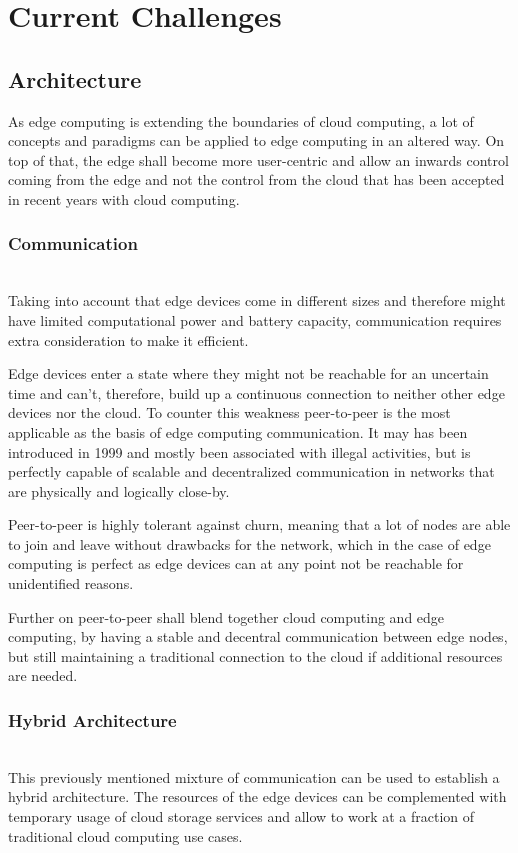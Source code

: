 \section{Current Challenges}\label{sec:main}

\subsection{Architecture}
As edge computing is extending the boundaries of cloud computing, a lot of concepts and paradigms can be applied to edge computing in an altered way. On top of that, the edge shall become more user-centric and allow an inwards control coming from the edge and not the control from the cloud that has been accepted in recent years with cloud computing.

\subsubsection{Communication}\hspace*{\fill} \\
Taking into account that edge devices come in different sizes and therefore might have limited computational power and battery capacity, communication requires extra consideration to make it efficient.

Edge devices enter a state where they might not be reachable for an uncertain time and can’t, therefore, build up a continuous connection to neither other edge devices nor the cloud.
To counter this weakness peer-to-peer is the most applicable as the basis of edge computing communication. It may has been introduced in 1999 and mostly been associated with illegal activities, but is perfectly capable of scalable and decentralized communication in networks that are physically and logically close-by. 

Peer-to-peer is highly tolerant against churn, meaning that a lot of nodes are able to join and leave without drawbacks for the network, which in the case of edge computing is perfect as edge devices can at any point not be reachable for unidentified reasons.

Further on peer-to-peer shall blend together cloud computing and edge computing, by having a stable and decentral communication between edge nodes, but still maintaining a traditional connection to the cloud if additional resources are needed. 

\subsubsection{Hybrid Architecture}\hspace*{\fill} \\
This previously mentioned mixture of communication can be used to establish a hybrid architecture. The resources of the edge devices can be complemented with temporary usage of cloud storage services  and allow to work at a fraction of traditional cloud computing use cases.

